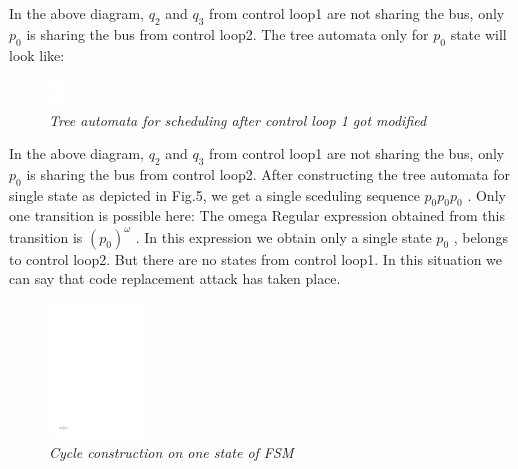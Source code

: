 In the above diagram, $q_2$ and $q_3$ from control loop1 are not sharing the bus, only $p_0$ is 
sharing the bus from control loop2. The tree automata only for $p_0$  state will look like:

\begin{figure}
\begin{center}
\includegraphics[width=5mm]{diagram_single_state.pdf}
\end{center}
\vspace{-0.1in}
\caption{{\em Tree automata for scheduling after control loop 1 got modified }}
\label{fig:automaton}
\end{figure}

In the above diagram, $q_2$ and $q_3$ from control loop1 are not sharing the bus, only
$p_0$ is sharing the bus from control loop2. After constructing the tree automata for
single state as depicted in Fig.5, we get a single sceduling sequence $p_0p_0p_0$ .
Only one transition is possible here:
The omega Regular expression obtained from this transition is $(p_0)^\omega$ . In this
expression we obtain only a single state $p_0$ , belongs to control loop2. But there
are no states from control loop1. In this situation we can say that code replacement attack
has taken place.

\begin{figure}[h]
\begin{center}
\includegraphics[width=1.0in]{one_state.pdf}
\end{center}
\vspace{-0.1in}
\caption{{\em Cycle construction on one state of FSM}}
\label{fig:automaton}
\end{figure}



